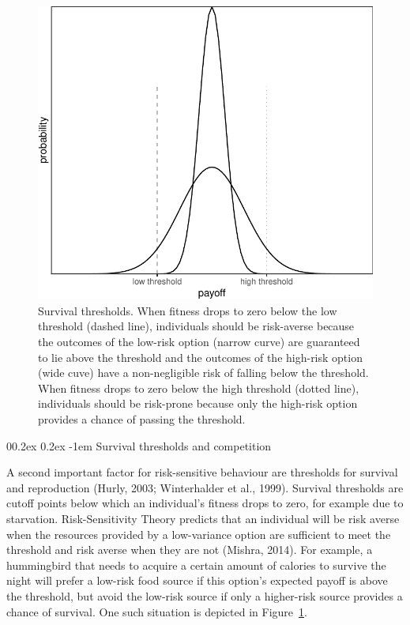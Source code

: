\documentclass[british,,doc,mask,floatsintext]{apa6}
\makeatletter
\renewcommand{\paragraph}{\@startsection{paragraph}{4}{\parindent}%
  {0\baselineskip \@plus 0.2ex \@minus 0.2ex}%
  {-1em}%
  {\normalfont\normalsize\bfseries\itshape\typesectitle}}
\makeatother
\begin{document}
\begin{figure}

{\centering \includegraphics[width=0.6\linewidth]{rr-risk-sensitivity_files/figure-latex/varianceplot-1} 

}

\caption{Survival thresholds. When fitness drops to zero below the low threshold (dashed line), individuals should be risk-averse because the outcomes of the low-risk option (narrow curve) are guaranteed to lie above the threshold and the outcomes of the high-risk option (wide cuve) have a non-negligible risk of falling below the threshold. When fitness drops to zero below the high threshold (dotted line), individuals should be risk-prone because only the high-risk option provides a chance of passing the threshold.}\label{fig:varianceplot}
\end{figure}

\hypertarget{survival-thresholds-and-competition}{%
\paragraph{Survival thresholds and competition}\label{survival-thresholds-and-competition}}

A second important factor for risk-sensitive behaviour are thresholds for survival and reproduction (Hurly, 2003; Winterhalder et al., 1999).
Survival thresholds are cutoff points below which an individual's fitness drops to zero, for example due to starvation.
Risk-Sensitivity Theory predicts that an individual will be risk averse when the resources provided by a low-variance option are sufficient to meet the threshold and risk averse when they are not (Mishra, 2014).
For example, a hummingbird that needs to acquire a certain amount of calories to survive the night will prefer a low-risk food source if this option's expected payoff is above the threshold, but avoid the low-risk source if only a higher-risk source provides a chance of survival.
One such situation is depicted in Figure~\ref{fig:varianceplot}.
\end{document}
